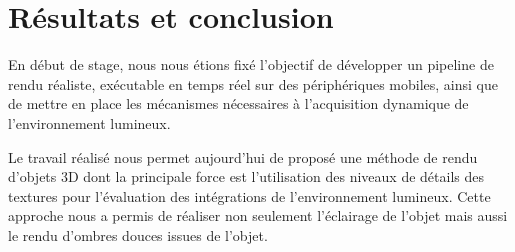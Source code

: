 \documentclass[10pt,a4paper,twoside, twocolumn]{report}
\begin{document}
\onecolumn


\chapter{Résultats et conclusion}


\iftwocolumn \begin{multicols}{2} \fi
En début de stage, nous nous étions fixé l’objectif de développer un pipeline de rendu réaliste, exécutable en temps réel sur des périphériques mobiles, ainsi que de mettre en place les mécanismes nécessaires à l’acquisition dynamique de l’environnement lumineux.

Le travail réalisé nous permet aujourd’hui de proposé une méthode de rendu d’objets 3D dont la principale force est l’utilisation des niveaux de détails des textures pour l’évaluation des intégrations de l’environnement lumineux. Cette approche nous a permis de réaliser non seulement l’éclairage de l’objet mais aussi le rendu d’ombres douces issues de l’objet.
\iftwocolumn \end{multicols} \fi
\end{document}
